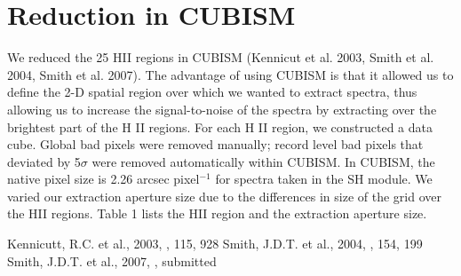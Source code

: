 \documentclass[manuscript]{aastex}
\begin{document}







\section{Reduction in CUBISM}

We reduced the 25 HII regions in CUBISM (Kennicut et al. 2003, Smith et al. 2004, Smith et al. 2007).
The advantage of using CUBISM is that it allowed us to define the  
2-D spatial region over which we wanted to extract spectra, thus allowing us 
to increase the signal-to-noise of the spectra by extracting over the 
brightest part of the H II regions.  For each H II region, we constructed 
a data cube.  Global bad pixels were removed manually; record level 
bad pixels that deviated by 5$\sigma$ were removed automatically 
within CUBISM.  In CUBISM, the native pixel size is 2.26 arcsec pixel$^{-1}$ 
for spectra taken in the SH module.  We varied our extraction aperture 
size due to the differences in size of the grid over the HII regions.  Table 1
lists the HII region and the extraction aperture size.  











\begin{thebibliography}{}
 Kennicutt, R.C. et al., 2003, \pasp, 115, 928
 Smith, J.D.T. et al., 2004, \apjs, 154, 199
 Smith, J.D.T. et al., 2007, \pasp, submitted
\end{thebibliography}
\end{document}
